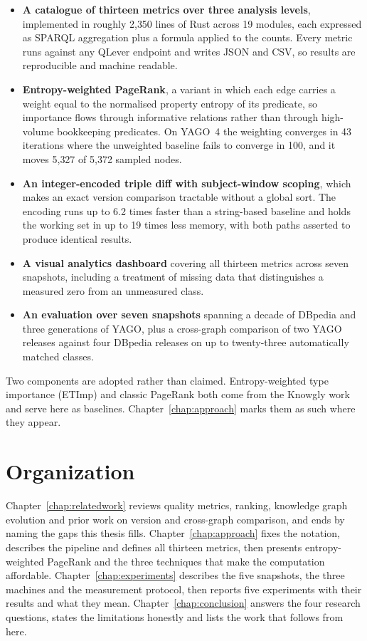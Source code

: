 \begin{itemize}
  \item \textbf{A catalogue of thirteen metrics over three analysis levels},
    implemented in roughly 2{,}350 lines of Rust across 19 modules, each
    expressed as SPARQL aggregation plus a formula applied to the counts. Every
    metric runs against any QLever endpoint and writes JSON and CSV, so results
    are reproducible and machine readable.
  \item \textbf{Entropy-weighted PageRank}, a variant in which each edge carries
    a weight equal to the normalised property entropy of its predicate, so
    importance flows through informative relations rather than through
    high-volume bookkeeping predicates. On YAGO~4 the weighting converges in 43
    iterations where the unweighted baseline fails to converge in 100, and it
    moves 5{,}327 of 5{,}372 sampled nodes.
  \item \textbf{An integer-encoded triple diff with subject-window scoping},
    which makes an exact version comparison tractable without a global sort. The
    encoding runs up to 6.2 times faster than a string-based baseline and holds
    the working set in up to 19 times less memory, with both paths asserted to
    produce identical results.
  \item \textbf{A visual analytics dashboard} covering all thirteen metrics
    across seven snapshots, including a treatment of missing data that
    distinguishes a measured zero from an unmeasured class.
  \item \textbf{An evaluation over seven snapshots} spanning a decade of DBpedia
    and three generations of YAGO, plus a cross-graph comparison of two YAGO
    releases against four DBpedia releases on up to twenty-three automatically
    matched classes.
\end{itemize}

Two components are adopted rather than claimed. Entropy-weighted type importance
(ETImp) and classic PageRank both come from the Knowgly work and serve here as
baselines. Chapter~\ref{chap:approach} marks them as such where they appear.

\section{Organization}
\label{sec:organization}

Chapter~\ref{chap:relatedwork} reviews quality metrics, ranking, knowledge graph
evolution and prior work on version and cross-graph comparison, and ends by
naming the gaps this thesis fills. Chapter~\ref{chap:approach} fixes the
notation, describes the pipeline and defines all thirteen metrics, then presents
entropy-weighted PageRank and the three techniques that make the computation
affordable. Chapter~\ref{chap:experiments} describes the five snapshots, the
three machines and the measurement protocol, then reports five experiments with
their results and what they mean. Chapter~\ref{chap:conclusion} answers the four
research questions, states the limitations honestly and lists the work that
follows from here.
